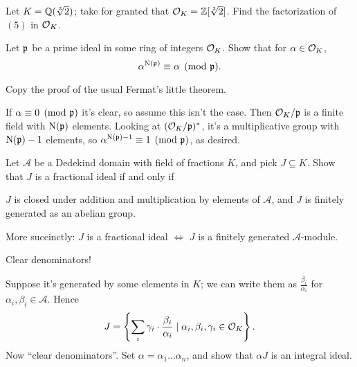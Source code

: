 \begin{problem}
	Let $K = \mathbb Q(\sqrt[3]{2})$;
	take for granted that $\mathcal O_K = \mathbb Z[\sqrt[3]{2}]$.
	Find the factorization of $(5)$ in $\mathcal O_K$.
\end{problem}

\begin{problem}
	Let $\mathfrak p$ be a prime ideal in some ring of integers $\mathcal O_K$.
	Show that for $\alpha \in \mathcal O_K$,
	\[ \alpha^{\operatorname{N}(\mathfrak p)} \equiv \alpha \pmod{\mathfrak p}. \]
	\begin{hint}
		Copy the proof of the usual Fermat's little theorem.
	\end{hint}
	\begin{sol}
		If $\alpha \equiv 0 \pmod{\mathfrak p}$ it's clear, so assume this isn't the case.
		Then $\mathcal O_K/\mathfrak p$ is a finite field with $\operatorname{N}(\mathfrak p)$ elements.
		Looking at $(\mathcal O_K/\mathfrak p)^\ast$, it's a multiplicative group with $\operatorname{N}(\mathfrak p)-1$ elements,
		so $\alpha^{\operatorname{N}(\mathfrak p)-1} \equiv 1 \pmod{\mathfrak p}$, as desired.
	\end{sol}
\end{problem}

\begin{dproblem}
	Let $\mathcal A$ be a Dedekind domain with field of fractions $K$,
	and pick $J \subseteq K$.
	Show that $J$ is a fractional ideal if and only if
	\begin{enumerate}[(i)]
		\ii $J$ is closed under addition and multiplication
		by elements of $\mathcal A$, and
		\ii $J$ is finitely generated as an abelian group.
	\end{enumerate}
	More succinctly: $J$ is a fractional ideal $\iff$ $J$ is a finitely generated $\mathcal A$-module.
	\label{prob:fractional_ideal_alt_def}
	\begin{hint}
		Clear denominators!
	\end{hint}
	\begin{sol}
		Suppose it's generated by some elements in $K$; we can write them as
		$\frac{\beta_i}{\alpha_i}$ for $\alpha_i, \beta_i \in \mathcal A$.
		Hence
		\[ J = \left\{ \sum_i \gamma_i \cdot \frac{\beta_i}{\alpha_i}
		\mid \alpha_i, \beta_i, \gamma_i \in \mathcal O_K \right\}. \]
		Now ``clear denominators''. Set $\alpha = \alpha_1 \dots \alpha_n$,
		and show that $\alpha J$ is an integral ideal.
	\end{sol}
\end{dproblem}

